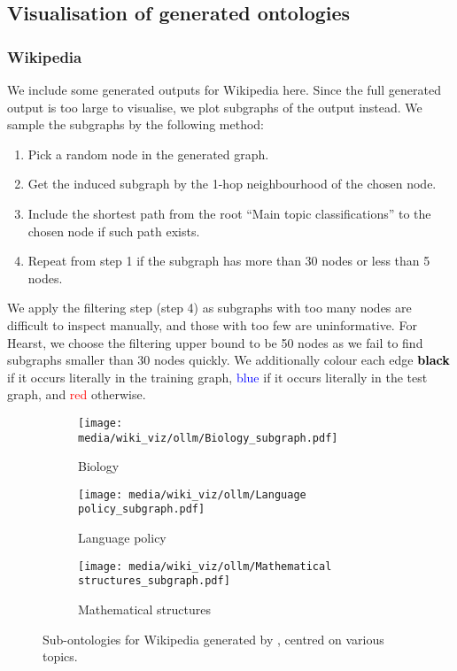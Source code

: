 \subsection{Visualisation of generated ontologies} \label{appendix:visualisation}

\subsubsection{Wikipedia} \label{appendix:viz-wiki}

We include some generated outputs for Wikipedia here. Since the full generated output is too large to visualise, we plot subgraphs of the output instead. We sample the subgraphs by the following method:
\begin{enumerate}
    \item Pick a random node in the generated graph. 
    \item Get the induced subgraph by the 1-hop neighbourhood of the chosen node.
    \item Include the shortest path from the root ``Main topic classifications'' to the chosen node if such path exists.
    \item Repeat from step 1 if the subgraph has more than 30 nodes or less than 5 nodes.
\end{enumerate}
We apply the filtering step (step 4) as subgraphs with too many nodes are difficult to inspect manually, and those with too few are uninformative. For Hearst, we choose the filtering upper bound to be 50 nodes as we fail to find subgraphs smaller than 30 nodes quickly. We additionally colour each edge \textcolor{black}{\textbf{black}} if it occurs literally in the training graph, \textcolor{blue}{blue} if it occurs literally in the test graph, and \textcolor{red}{red} otherwise.

\newpage
\begin{figure}[H]
    \centering
    \begin{subfigure}{0.9\textwidth}
    \centering
    \texttt{[image: media/wiki\_viz/ollm/Biology\_subgraph.pdf]}
    \caption{Biology}
    \end{subfigure}
    \begin{subfigure}{0.9\textwidth}
    \centering
    \texttt{[image: media/wiki\_viz/ollm/Language policy\_subgraph.pdf]}
    \caption{Language policy}
    \end{subfigure}
    \begin{subfigure}{0.9\textwidth}
    \centering
    \texttt{[image: media/wiki\_viz/ollm/Mathematical structures\_subgraph.pdf]}
    \caption{Mathematical structures}
    \label{fig:ollm-wiki-samples-math}
    \end{subfigure}
    \caption{Sub-ontologies for Wikipedia generated by \name, centred on various topics.}
\end{figure}

